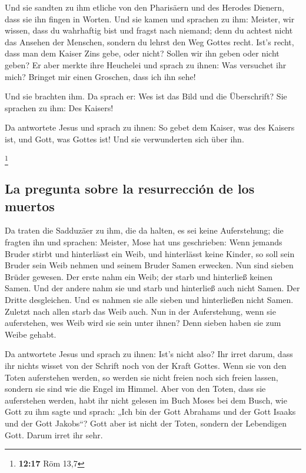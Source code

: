  Und sie sandten zu ihm etliche von den Pharisäern und
des Herodes Dienern, dass sie ihn fingen in Worten.  Und
sie kamen und sprachen zu ihm: Meister, wir wissen, dass du wahrhaftig
bist und fragst nach niemand; denn du achtest nicht das Ansehen der
Menschen, sondern du lehrst den Weg Gottes recht. Ist's recht, dass man
dem Kaiser Zins gebe, oder nicht? Sollen wir ihn geben oder nicht geben?
 Er aber merkte ihre Heuchelei und sprach zu ihnen: Was
versuchet ihr mich? Bringet mir einen Groschen, dass ich ihn sehe!

 Und sie brachten ihm. Da sprach er: Wes ist das Bild und
die Überschrift? Sie sprachen zu ihm: Des Kaisers!

 Da antwortete Jesus und sprach zu ihnen: So gebet dem
Kaiser, was des Kaisers ist, und Gott, was Gottes ist! Und sie
verwunderten sich über ihn.

\footnote{\textbf{12:17} Röm 13,7}

\hypertarget{la-pregunta-sobre-la-resurrecciuxf3n-de-los-muertos}{%
\subsection{La pregunta sobre la resurrección de los
muertos}\label{la-pregunta-sobre-la-resurrecciuxf3n-de-los-muertos}}

 Da traten die Sadduzäer zu ihm, die da halten, es sei
keine Auferstehung; die fragten ihn und sprachen: 
Meister, Mose hat uns geschrieben: Wenn jemands Bruder stirbt und
hinterlässt ein Weib, und hinterlässt keine Kinder, so soll sein Bruder
sein Weib nehmen und seinem Bruder Samen erwecken.  Nun
sind sieben Brüder gewesen. Der erste nahm ein Weib; der starb und
hinterließ keinen Samen.  Und der andere nahm sie und
starb und hinterließ auch nicht Samen. Der Dritte desgleichen.
 Und es nahmen sie alle sieben und hinterließen nicht
Samen. Zuletzt nach allen starb das Weib auch.  Nun in
der Auferstehung, wenn sie auferstehen, wes Weib wird sie sein unter
ihnen? Denn sieben haben sie zum Weibe gehabt.

 Da antwortete Jesus und sprach zu ihnen: Ist's nicht
also? Ihr irret darum, dass ihr nichts wisset von der Schrift noch von
der Kraft Gottes.  Wenn sie von den Toten auferstehen
werden, so werden sie nicht freien noch sich freien lassen, sondern sie
sind wie die Engel im Himmel.  Aber von den Toten, dass
sie auferstehen werden, habt ihr nicht gelesen im Buch Moses bei dem
Busch, wie Gott zu ihm sagte und sprach: „Ich bin der Gott Abrahams und
der Gott Isaaks und der Gott Jakobs``?  Gott aber ist
nicht der Toten, sondern der Lebendigen Gott. Darum irret ihr sehr.

